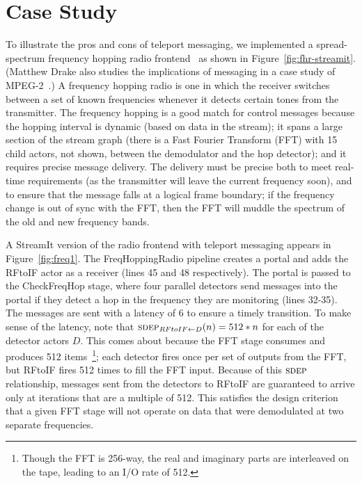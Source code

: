 %

\section{Case Study}
\label{sec:casestudy}

To illustrate the pros and cons of teleport messaging, we implemented
a spread-spectrum frequency hopping radio frontend~\cite{harada02} as
shown in Figure~\ref{fig:fhr-streamit}.  (Matthew Drake also studies
the implications of messaging in a case study of
MPEG-2~\cite{ipdps2006,drake-thesis}.)  A frequency hopping radio is
one in which the receiver switches between a set of known frequencies
whenever it detects certain tones from the transmitter.  The frequency
hopping is a good match for control messages because the hopping
interval is dynamic (based on data in the stream); it spans a large
section of the stream graph (there is a Fast Fourier Transform (FFT)
with 15 child actors, not shown, between the demodulator and the hop
detector); and it requires precise message delivery.  The delivery
must be precise both to meet real-time requirements (as the
transmitter will leave the current frequency soon), and to ensure that
the message falls at a logical frame boundary; if the frequency change
is out of sync with the FFT, then the FFT will muddle the spectrum of
the old and new frequency bands.

A StreamIt version of the radio frontend with teleport messaging
appears in Figure~\ref{fig:freq1}.  The FreqHoppingRadio pipeline
creates a portal and adds the RFtoIF actor as a receiver (lines 45 and
48 respectively).  The portal is passed to the CheckFreqHop stage,
where four parallel detectors send messages into the portal if they
detect a hop in the frequency they are monitoring (lines 32-35).  The
messages are sent with a latency of 6 to ensure a timely transition.
To make sense of the latency, note that $\textsc{sdep}_{RFtoIF \small{\leftarrow} D}(n) = 512*n$
for each of the detector actors $D$.  This comes about because the FFT
stage consumes and produces 512 items~\footnote{Though the FFT is
  256-way, the real and imaginary parts are interleaved on the tape,
  leading to an I/O rate of 512.}; each detector fires once per set of
outputs from the FFT, but RFtoIF fires 512 times to fill the FFT
input.  Because of this $\textsc{sdep}$ relationship, messages sent from the
detectors to RFtoIF are guaranteed to arrive only at iterations that
are a multiple of 512.  This satisfies the design criterion that a
given FFT stage will not operate on data that were demodulated at two
separate frequencies.

